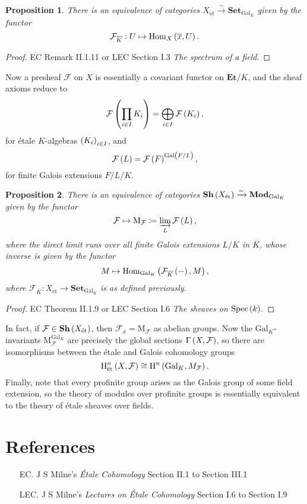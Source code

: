 \documentclass{article}
\newtheorem*{proposition}{Proposition}
\newcommand{\br}{\del}
\newcommand{\et}{\mathrm{\acute{e}t}}
\newcommand{\Et}{\mathbf{\acute{E}t}}
\newcommand{\F}{\mathcal{F}}
\newcommand{\Gal}{\mathrm{Gal}}
\renewcommand{\H}{\mathrm{H}}
\newcommand{\Hom}{\mathrm{Hom}}
\newcommand{\M}{\mathrm{M}}
\newcommand{\Mod}{\mathbf{Mod}}
\newcommand{\Set}{\mathbf{Set}}
\newcommand{\Sh}{\mathbf{Sh}}
\newcommand{\Spec}{\operatorname{Spec}}
\begin{document}
\begin{proposition}
There is an equivalence of categories $ X_\et \xrightarrow{\sim} \Set_{\Gal_K} $ given by the functor
$$ \F_{\overline{K}} : U \mapsto \Hom_X\br{\overline{x}, U}. $$
\end{proposition}

\begin{proof}
EC Remark II.1.11 or LEC Section I.3 \emph{The spectrum of a field}.
\end{proof}

Now a presheaf $ \F $ on $ X $ is essentially a covariant functor on $ \Et / K $, and the sheaf axioms reduce to
$$ \F\br{\prod_{i \in I} K_i} = \bigoplus_{i \in I} \F\br{K_i}, $$
for \'etale $ K $-algebras $ \br{K_i}_{i \in I} $, and
$$ \F\br{L} = \F\br{F}^{\Gal\br{F / L}}, $$
for finite Galois extensions $ F / L / K $.

\begin{proposition}
There is an equivalence of categories $ \Sh\br{X_\et} \xrightarrow{\sim} \Mod_{\Gal_K} $ given by the functor
$$ \F \mapsto \M_\F \coloneqq \varinjlim_L \F\br{L}, $$
where the direct limit runs over all finite Galois extensions $ L / K $ in $ \overline{K} $, whose inverse is given by the functor
$$ M \mapsto \Hom_{\Gal_K}\br{\F_{\overline{K}}\br{-}, M}, $$
where $ \F_{\overline{K}} : X_\et \to \Set_{\Gal_K} $ is as defined previously.
\end{proposition}

\begin{proof}
EC Theorem II.1.9 or LEC Section I.6 \emph{The sheaves on $ \Spec\br{k} $}.
\end{proof}

In fact, if $ \F \in \Sh\br{X_\et} $, then $ \F_{\overline{x}} = \M_\F $ as abelian groups. Now the $ \Gal_K $-invariants $ \M_\F^{\Gal_K} $ are precisely the global sections $ \Gamma\br{X, \F} $, so there are isomorphisms between the \'etale and Galois cohomology groups
$$ \H_\et^n\br{X, \F} \cong \H^n\br{\Gal_K, M_\F}. $$
Finally, note that every profinite group arises as the Galois group of some field extension, so the theory of modules over profinite groups is essentially equivalent to the theory of \'etale sheaves over fields.

\section*{References}

\begin{itemize}
\item[EC.] J S Milne's \emph{\'Etale Cohomology} Section II.1 to Section III.1
\item[LEC.] J S Milne's \emph{Lectures on \'Etale Cohomology} Section I.6 to Section I.9
\end{itemize}
\end{document}
